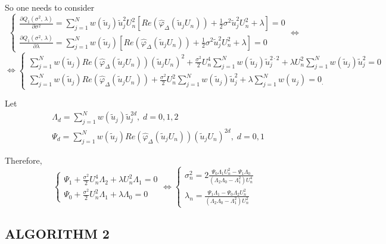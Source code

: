 So one needs to consider \[ \begin{cases}
    \frac{\partial Q_1(\sigma^2, \, \lambda)}{\partial \sigma^2} = \sum\limits_{j=1}^{N} w(\tilde{u}_j) \tilde{u}_j^2 U_n^2 \left[ Re(\hat{\varphi}_{\Delta}(\tilde{u}_j U_n)) + \frac{1}{2} \sigma^2 \tilde{u}_j^2 U_n^2 + \lambda \right] = 0 \\
    \frac{\partial Q_1(\sigma^2, \, \lambda)}{\partial \lambda} = \sum\limits_{j=1}^{N} w(\tilde{u}_j) \left[ Re(\hat{\varphi}_{\Delta}(\tilde{u}_j U_n)) + \frac{1}{2} \sigma^2 \tilde{u}_j^2 U_n^2 + \lambda \right] = 0
\end{cases} \Leftrightarrow \]
\[ \Leftrightarrow \begin{cases}
    \sum\limits_{j=1}^{N} w(\tilde{u}_j) Re(\hat{\varphi}_{\Delta}(\tilde{u}_j U_n)) (\tilde{u}_j U_n)^2 + \frac{\sigma^2}{2} U_n^4 \sum\limits_{j=1}^{N} w(\tilde{u}_j)\tilde{u}_j^{2 \cdot 2} + \lambda U_n^2 \sum\limits_{j=1}^{N} w(\tilde{u}_j) \tilde{u}_j^2 = 0 \\
     \sum\limits_{j=1}^{N} w(\tilde{u}_j) Re(\hat{\varphi}_{\Delta}(\tilde{u}_j U_n)) + \frac{\sigma^2}{2} U_n^2 \sum\limits_{j=1}^{N} w(\tilde{u}_j)\tilde{u}_j^{2} + \lambda \sum\limits_{j=1}^{N} w(u_j) = 0_.
\end{cases} \]

Let \[ \begin{aligned}
    & \Lambda_d = \sum\limits_{j=1}^{N} w(\tilde{u}_j) \tilde{u}_j^{2d}, \; d = 0, 1, 2 \\
    & \Psi_d = \sum\limits_{j=1}^N w(\tilde{u}_j) Re(\hat{\varphi}_{\Delta}(\tilde{u}_j U_n))(\tilde{u}_j U_n)^{2d}, \; d = 0, 1
\end{aligned} \]

Therefore, \[ \begin{cases}
    \Psi_1 + \frac{\sigma^2}{2} U_n^4 \Lambda_2 + \lambda U_n^2 \Lambda_1 = 0 \\
    \Psi_0 + \frac{\sigma^2}{2} U_n^2 \Lambda_1 + \lambda \Lambda_0 = 0
\end{cases} \Leftrightarrow \begin{cases}
    \sigma^2_n = 2 \frac{\Psi_0 \Lambda_1 U_n^2 - \Psi_1 \Lambda_0}{(\Lambda_2 \Lambda_0 - \Lambda_1^2) U_n^4} \\
    \lambda_n = \frac{\Psi_1 \Lambda_1 - \Psi_0 \Lambda_2 U_n^2}{(\Lambda_2 \Lambda_0 - \Lambda_1^2) U_n^2}
\end{cases} \]

\subsection{ALGORITHM 2}

